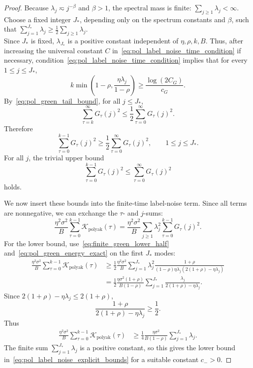\documentclass[11pt]{article}
\newcommand{\polyak}{\mathrm{polyak}}
\begin{document}
\begin{proof}
Because $\lambda_j\eqsim j^{-\beta}$ and $\beta>1$, the spectral mass is finite:
$\sum_{j\ge1}\lambda_j<\infty.$\\
Choose a fixed integer $J_*$, depending only on the spectrum constants and $\beta$, such that
$\sum_{j=1}^{J_*}\lambda_j\ge\frac12\sum_{j\ge1}\lambda_j.$\\
Since $J_*$ is fixed, $\lambda_{J_*}$ is a positive constant independent of $\eta,\rho,k,B$. Thus, after increasing the universal constant $C$ in~\eqref{eq:pol_label_noise_time_condition} if necessary, condition~\eqref{eq:pol_label_noise_time_condition} implies that for every $1\le j\le J_*$,
\[
    k\min\left(1-\rho,\frac{\eta\lambda_j}{1-\rho}\right)
    \ge
    \frac{\log(2C_G)}{c_G}.
\]
By~\eqref{eq:pol_green_tail_bound}, for all $j\le J_*$,
\[
    \sum_{\tau=k}^{\infty}G_\tau(j)^2
    \le
    \frac12\sum_{\tau=0}^{\infty}G_\tau(j)^2.
\]
Therefore
\begin{equation}
\label{eq:finite_green_lower_half}
    \sum_{\tau=0}^{k-1}G_\tau(j)^2
    \ge
    \frac12\sum_{\tau=0}^{\infty}G_\tau(j)^2,
    \qquad 1\le j\le J_*.
\end{equation}
For all $j$, the trivial upper bound
\begin{equation}
\label{eq:finite_green_upper_saturated}
    \sum_{\tau=0}^{k-1}G_\tau(j)^2
    \le
    \sum_{\tau=0}^{\infty}G_\tau(j)^2
\end{equation}
holds.

We now insert these bounds into the finite-time label-noise term. Since all terms are nonnegative, we can exchange the $\tau$- and $j$-sums:
\[
    \frac{\eta^2\sigma^2}{B}\sum_{\tau=0}^{k-1}\mathcal K_{\polyak}(\tau)
    =
    \frac{\eta^2\sigma^2}{B}
    \sum_{j\ge1}\lambda_j^2\sum_{\tau=0}^{k-1}G_\tau(j)^2.
\]
For the lower bound, use~\eqref{eq:finite_green_lower_half} and~\eqref{eq:pol_green_energy_exact} on the first $J_*$ modes:
\begin{align*}
    \frac{\eta^2\sigma^2}{B}\sum_{\tau=0}^{k-1}\mathcal K_{\polyak}(\tau)
    &\ge
    \frac12\frac{\eta^2\sigma^2}{B}
    \sum_{j=1}^{J_*}\lambda_j^2
    \frac{1+\rho}{(1-\rho)\eta\lambda_j(2(1+\rho)-\eta\lambda_j)} \\
    &=
    \frac12\frac{\eta\sigma^2(1+\rho)}{B(1-\rho)}
    \sum_{j=1}^{J_*}\frac{\lambda_j}{2(1+\rho)-\eta\lambda_j}.
\end{align*}
Since $2(1+\rho)-\eta\lambda_j\le2(1+\rho)$,
\[
    \frac{1+\rho}{2(1+\rho)-\eta\lambda_j}\ge \frac12.
\]
Thus
\begin{align*}
    \frac{\eta^2\sigma^2}{B}\sum_{\tau=0}^{k-1}\mathcal K_{\polyak}(\tau)
    &\ge
    \frac14\frac{\eta\sigma^2}{B(1-\rho)}
    \sum_{j=1}^{J_*}\lambda_j.
\end{align*}
The finite sum $\sum_{j=1}^{J_*}\lambda_j$ is a positive constant, so this gives the lower bound in~\eqref{eq:pol_label_noise_explicit_bounds} for a suitable constant $c_->0$.


\end{proof}
\end{document}
